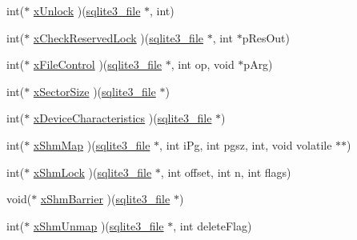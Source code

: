 \begin{DoxyCompactItemize}
\item 
int($\ast$ \hyperlink{structsqlite3__io__methods_ac90eeb9153eb6608a1872760660e718f}{x\-Unlock} )(\hyperlink{structsqlite3__file}{sqlite3\-\_\-file} $\ast$, int)
\item 
int($\ast$ \hyperlink{structsqlite3__io__methods_a97f5eb0c2dc7e1cf2f8ecd6857e4c77c}{x\-Check\-Reserved\-Lock} )(\hyperlink{structsqlite3__file}{sqlite3\-\_\-file} $\ast$, int $\ast$p\-Res\-Out)
\item 
int($\ast$ \hyperlink{structsqlite3__io__methods_a5d2a5ba7937b4a6c6c5ba62c4e2b9166}{x\-File\-Control} )(\hyperlink{structsqlite3__file}{sqlite3\-\_\-file} $\ast$, int op, void $\ast$p\-Arg)
\item 
int($\ast$ \hyperlink{structsqlite3__io__methods_a8436e6eeac404b35057be97f3c2b5c3d}{x\-Sector\-Size} )(\hyperlink{structsqlite3__file}{sqlite3\-\_\-file} $\ast$)
\item 
int($\ast$ \hyperlink{structsqlite3__io__methods_ace5e9e9f267c6c57023109c0658f2683}{x\-Device\-Characteristics} )(\hyperlink{structsqlite3__file}{sqlite3\-\_\-file} $\ast$)
\item 
int($\ast$ \hyperlink{structsqlite3__io__methods_a42d21006b7f01acb258986f2c090c64d}{x\-Shm\-Map} )(\hyperlink{structsqlite3__file}{sqlite3\-\_\-file} $\ast$, int i\-Pg, int pgsz, int, void volatile $\ast$$\ast$)
\item 
int($\ast$ \hyperlink{structsqlite3__io__methods_a58f4a6b0df86440029cc5fa1b65b1b4e}{x\-Shm\-Lock} )(\hyperlink{structsqlite3__file}{sqlite3\-\_\-file} $\ast$, int offset, int n, int flags)
\item 
void($\ast$ \hyperlink{structsqlite3__io__methods_aedf4a59fa25ad33e0625a2aa0f6f2184}{x\-Shm\-Barrier} )(\hyperlink{structsqlite3__file}{sqlite3\-\_\-file} $\ast$)
\item 
int($\ast$ \hyperlink{structsqlite3__io__methods_af69cbc7ece1854576ac262f986871563}{x\-Shm\-Unmap} )(\hyperlink{structsqlite3__file}{sqlite3\-\_\-file} $\ast$, int delete\-Flag)
\end{DoxyCompactItemize}


